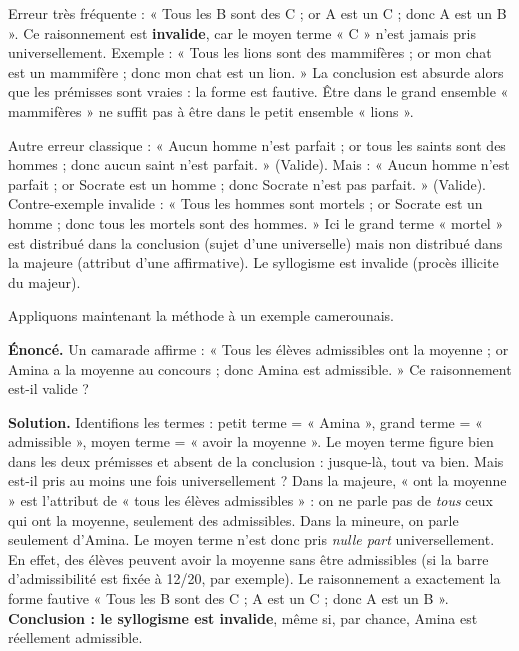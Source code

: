 \documentclass[11pt]{article}
\begin{document}
\begin{attention}
Erreur très fréquente : « Tous les B sont des C ; or A est un C ; donc A est un B ». Ce raisonnement est \textbf{invalide}, car le moyen terme « C » n'est jamais pris universellement. Exemple : « Tous les lions sont des mammifères ; or mon chat est un mammifère ; donc mon chat est un lion. » La conclusion est absurde alors que les prémisses sont vraies : la forme est fautive. Être dans le grand ensemble « mammifères » ne suffit pas à être dans le petit ensemble « lions ».
\end{attention}

\begin{attention}
Autre erreur classique : « Aucun homme n'est parfait ; or tous les saints sont des hommes ; donc aucun saint n'est parfait. » (Valide). Mais : « Aucun homme n'est parfait ; or Socrate est un homme ; donc Socrate n'est pas parfait. » (Valide). Contre-exemple invalide : « Tous les hommes sont mortels ; or Socrate est un homme ; donc tous les mortels sont des hommes. » Ici le grand terme « mortel » est distribué dans la conclusion (sujet d'une universelle) mais non distribué dans la majeure (attribut d'une affirmative). Le syllogisme est invalide (procès illicite du majeur).
\end{attention}

Appliquons maintenant la méthode à un exemple camerounais.

\begin{exoresolu}
\textbf{Énoncé.} Un camarade affirme : « Tous les élèves admissibles ont la moyenne ; or Amina a la moyenne au concours ; donc Amina est admissible. » Ce raisonnement est-il valide ?

\tcblower
\textbf{Solution.} Identifions les termes : petit terme = « Amina », grand terme = « admissible », moyen terme = « avoir la moyenne ». Le moyen terme figure bien dans les deux prémisses et absent de la conclusion : jusque-là, tout va bien. Mais est-il pris au moins une fois universellement ? Dans la majeure, « ont la moyenne » est l'attribut de « tous les élèves admissibles » : on ne parle pas de \emph{tous} ceux qui ont la moyenne, seulement des admissibles. Dans la mineure, on parle seulement d'Amina. Le moyen terme n'est donc pris \emph{nulle part} universellement. En effet, des élèves peuvent avoir la moyenne sans être admissibles (si la barre d'admissibilité est fixée à 12/20, par exemple). Le raisonnement a exactement la forme fautive « Tous les B sont des C ; A est un C ; donc A est un B ». \textbf{Conclusion : le syllogisme est invalide}, même si, par chance, Amina est réellement admissible.
\end{exoresolu}
\end{document}
